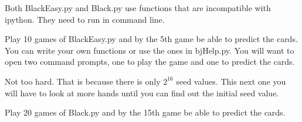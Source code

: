 \begin{warn}
Both BlackEasy.py and Black.py use functions that are incompatible with ipython. They need to run  in command line.
\end{warn}



\begin{problem}
Play 10 games of BlackEasy.py and by the 5th game be able to predict the cards.
You can write your own functions or use the ones in bjHelp.py.
You will want to open two command prompts, one to play the game and one to predict the cards. 
\end{problem}

Not too hard.
That is because there is only $2^{16}$ seed values.
This next one you will have to look at more hands until you can find out the initial seed value.

\begin{problem}
Play 20 games of Black.py and by the 15th game be able to predict the cards.
\end{problem}
